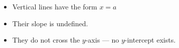 \documentclass[11pt]{article}
\begin{document}
\begin{tcolorbox}[colback=red!5!white, colframe=red!80!black, title=Important Notes on Vertical Lines]
\begin{itemize}
  \item Vertical lines have the form \( x = a \)
  \item Their slope is undefined.
  \item They do not cross the \( y \)-axis — no \( y \)-intercept exists.
\end{itemize}
\end{tcolorbox}
\end{document}
